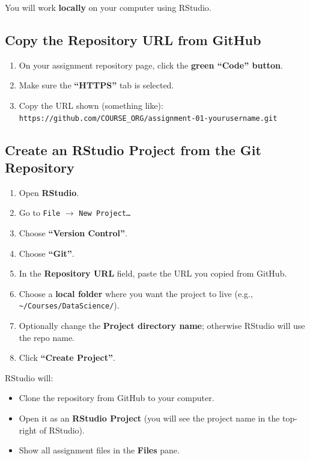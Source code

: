 \documentclass[11pt]{scrartcl}
\begin{document}
You will work \textbf{locally} on your computer using RStudio.

\subsection{Copy the Repository URL from GitHub}

\begin{enumerate}[label=\arabic*., nosep]
  \item On your assignment repository page, click the \textbf{green ``Code'' button}.
  \item Make sure the \textbf{``HTTPS''} tab is selected.
  \item Copy the URL shown (something like):\\[0.25em]
  \texttt{https://github.com/COURSE\_ORG/assignment-01-yourusername.git}
\end{enumerate}

\subsection{Create an RStudio Project from the Git Repository}

\begin{enumerate}[label=\arabic*., nosep]
  \item Open \textbf{RStudio}.
  \item Go to \texttt{File} $\rightarrow$ \texttt{New Project\ldots}
  \item Choose \textbf{``Version Control''}.
  \item Choose \textbf{``Git''}.
  \item In the \textbf{Repository URL} field, paste the URL you copied from GitHub.
  \item Choose a \textbf{local folder} where you want the project to live (e.g., \verb|~/Courses/DataScience/|).
  \item Optionally change the \textbf{Project directory name}; otherwise RStudio will use the repo name.
  \item Click \textbf{``Create Project''}.
\end{enumerate}

RStudio will:

\begin{itemize}[nosep]
  \item Clone the repository from GitHub to your computer.
  \item Open it as an \textbf{RStudio Project} (you will see the project name in the top-right of RStudio).
  \item Show all assignment files in the \textbf{Files} pane.
\end{itemize}
\end{document}
